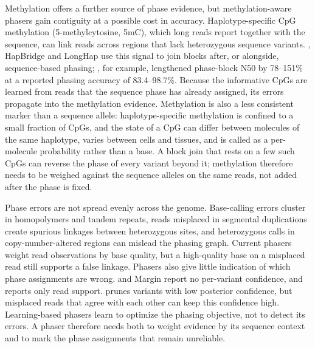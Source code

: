 Methylation offers a further source of phase evidence, but methylation-aware phasers gain contiguity at a possible cost in accuracy. Haplotype-specific CpG methylation (5-methylcytosine, 5mC), which long reads report together with the sequence, can link reads across regions that lack heterozygous sequence variants\cite{akbari2021nanomethphase,fu2024methphaser}. \methphaser, HapBridge and LongHap use this signal to join blocks after, or alongside, sequence-based phasing\cite{fu2024methphaser,chen2025hapbridge,pfennig2026longhap}; \methphaser, for example, lengthened phase-block N50 by 78--151\% at a reported phasing accuracy of 83.4--98.7\%\cite{fu2024methphaser}. Because the informative CpGs are learned from reads that the sequence phase has already assigned, its errors propagate into the methylation evidence. Methylation is also a less consistent marker than a sequence allele: haplotype-specific methylation is confined to a small fraction of CpGs, and the state of a CpG can differ between molecules of the same haplotype, varies between cells and tissues, and is called as a per-molecule probability rather than a base\cite{akbari2021nanomethphase,fu2024methphaser}. A block join that rests on a few such CpGs can reverse the phase of every variant beyond it; methylation therefore needs to be weighed against the sequence alleles on the same reads, not added after the phase is fixed.

Phase errors are not spread evenly across the genome. Base-calling errors cluster in homopolymers and tandem repeats, reads misplaced in segmental duplications create spurious linkages between heterozygous sites, and heterozygous calls in copy-number-altered regions can mislead the phasing graph\cite{olson2023benchmarking,dwarshuis2024stratifications}. Current phasers weight read observations by base quality\cite{patterson2015whatshap,edge2017hapcut2}, but a high-quality base on a misplaced read still supports a false linkage. Phasers also give little indication of which phase assignments are wrong. \whatshap and Margin report no per-variant confidence, and \longphase reports only read support. \hapcut prunes variants with low posterior confidence\cite{edge2017hapcut2}, but misplaced reads that agree with each other can keep this confidence high. Learning-based phasers learn to optimize the phasing objective, not to detect its errors\cite{xue2022neurhap,battistella2025ralphi}. A phaser therefore needs both to weight evidence by its sequence context and to mark the phase assignments that remain unreliable.

